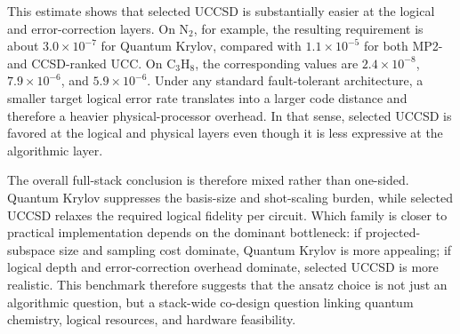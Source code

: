 This estimate shows that selected UCCSD is substantially easier at the logical
and error-correction layers. On N$_2$, for example, the resulting requirement is
about $3.0\times 10^{-7}$ for Quantum Krylov, compared with $1.1\times 10^{-5}$ for
both MP2- and CCSD-ranked UCC. On C$_3$H$_8$, the corresponding values are
$2.4\times 10^{-8}$, $7.9\times 10^{-6}$, and $5.9\times 10^{-6}$. Under any
standard fault-tolerant architecture, a smaller target logical error rate
translates into a larger code distance and therefore a heavier physical-processor
overhead. In that sense, selected UCCSD is favored at the logical and physical
layers even though it is less expressive at the algorithmic layer.

The overall full-stack conclusion is therefore mixed rather than one-sided.
Quantum Krylov suppresses the basis-size and shot-scaling burden, while selected UCCSD
relaxes the required logical fidelity per circuit. Which family is closer to
practical implementation depends on the dominant bottleneck: if projected-subspace
size and sampling cost dominate, Quantum Krylov is more appealing; if logical depth and
error-correction overhead dominate, selected UCCSD is more realistic. This
benchmark therefore suggests that the ansatz choice is not just an algorithmic
question, but a stack-wide co-design question linking quantum chemistry, logical
resources, and hardware feasibility.
